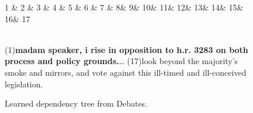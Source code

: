 \begin{figure}[!htb]
\begin{dependency}[theme=simple,hide label,label style={font=\bfseries,thick},edge style={black!60!black,thick}]
  \begin{deptext}
    1 \& 2 \& 3 \& 4 \& 5 \& 6 \& 7 \& 8\& 9\& 10\& 11\& 12\& 13\& 14\& 15\& 16\& 17\\
  \end{deptext}
\end{dependency}
\small{\\ (1)\textbf{madam speaker, i rise in opposition to h.r. 3283 on both process and policy grounds.}\ldots 
\small{(17)look beyond the majority's smoke and mirrors, and vote against this ill-timed and ill-conceived legislation.\hfill}}
\vspace{-0.7em}
\caption{Learned dependency tree from Debates.}
\label{fig:tree2}
\end{figure}



